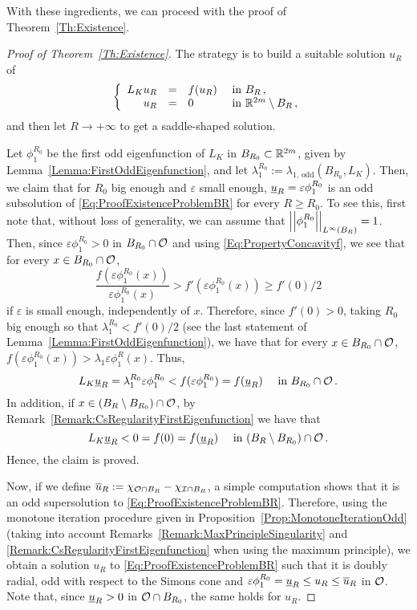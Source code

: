 With these ingredients, we can proceed with the proof of Theorem~\ref{Th:Existence}.

\begin{proof}[Proof of Theorem~\ref{Th:Existence}]
	The strategy is to build a suitable solution $u_R$ of 
	\begin{equation}
	\label{Eq:ProofExistenceProblemBR}
	\left\{\begin{array}{rcll}
	L_K u_R &=& f(u_R) & \textrm{ in } B_R\,,\\
	u_R &=& 0 & \textrm{ in }\mathbb{R}^{2m} \setminus B_R\,,
	\end{array} \right.
	\end{equation}
	and then let $R\to+ \infty$ to get a saddle-shaped solution.
	
	Let $\phi_1^{R_0}$ be the first odd eigenfunction of $L_K$ in $B_{R_0} \subset \mathbb{R}^{2m}$, given by Lemma~\ref{Lemma:FirstOddEigenfunction}, and let  $\lambda_1^{R_0} := \lambda_{1, \, \mathrm{odd}}(B_{R_0}, L_K)$. Then, we claim that for $R_0$ big enough and $\varepsilon$ small enough, $\underline{u}_R = \varepsilon\phi_1^{R_0} $ is an odd subsolution of \eqref{Eq:ProofExistenceProblemBR} for every $R\geq R_0$. To see this, first note that, without loss of generality, we can assume that $\left | \left |{\phi_1^{R_0}} \right | \right |_{L^\infty(B_R)}=1$. Then, since $\varepsilon \phi_1^{R_0}>0$ in $B_{R_0}\cap \mathcal{O}$ and using \eqref{Eq:PropertyConcavityf}, we see that for every $x\in B_{R_0}\cap \mathcal{O}$,
	$$
	\dfrac{f(\varepsilon \phi_1^{R_0}(x))}{\varepsilon \phi_1^{R_0}(x)} > f'(\varepsilon \phi_1^{R_0}(x)) \geq f'(0)/2
	$$
	if $\varepsilon$ is small enough, independently of $x$. Therefore, since $f'(0)>0$, taking $R_0$ big enough so that $\lambda_1^{R_0} < f'(0)/2$ (see the last statement of Lemma~\ref{Lemma:FirstOddEigenfunction}), we have that for every $x\in B_{R_0}\cap \mathcal{O}$,  $f(\varepsilon \phi_1^{R_0}(x)) > \lambda_1 \varepsilon \phi_1^R(x)$. Thus,
	$$
	L_K \underline{u}_R = \lambda_1^{R_0} \varepsilon \phi_1^{R_0} < f(\varepsilon\phi_1^{R_0}) = f(\underline{u}_R) \quad \textrm{ in } B_{R_0}\cap \mathcal{O}\,.
	$$
	In addition, if $x\in (B_R\setminus B_{R_0})\cap\mathcal{O}$, by Remark~\ref{Remark:CsRegularityFirstEigenfunction} we have that
	$$
	L_K \underline{u}_R < 0 = f(0) =  f(\underline{u}_R) \quad \textrm{ in } (B_R\setminus B_{R_0})\cap \mathcal{O}\,.
	$$
	Hence, the claim is proved.
	
	Now, if we define $\overline{u}_R := \chi_{\mathcal{O} \cap B_R} - \chi_{\mathcal{I} \cap B_R}$, a simple computation shows that it is an odd supersolution to \eqref{Eq:ProofExistenceProblemBR}. Therefore, using the monotone iteration procedure given in Proposition~\ref{Prop:MonotoneIterationOdd} (taking into account Remarks~\ref{Remark:MaxPrincipleSingularity} and \ref{Remark:CsRegularityFirstEigenfunction} when using the maximum principle), we obtain a solution $u_R$ to \eqref{Eq:ProofExistenceProblemBR} such that it is doubly radial, odd with respect to the Simons cone and $\varepsilon \phi_1^{R_0} = \underline{u}_R \leq u_R \leq \overline{u}_R$ in $\mathcal{O}$. Note that, since $\underline{u}_R > 0$ in $\mathcal{O} \cap B_{R_0}$, the same holds for $u_R$.
	

\end{proof}
